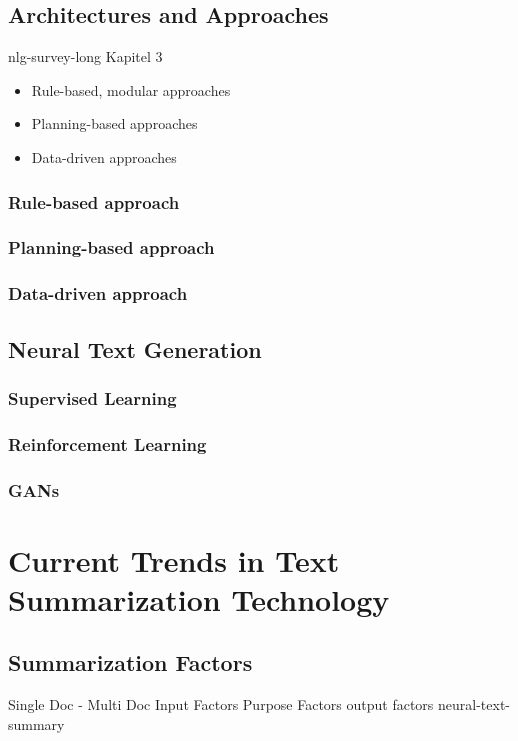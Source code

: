 \subsection{Architectures and Approaches}

nlg-survey-long Kapitel 3

\begin{itemize}
	\item Rule-based, modular approaches
	\item Planning-based approaches
	\item Data-driven approaches
\end{itemize}

\subsubsection{Rule-based approach}
\subsubsection{Planning-based approach}
\subsubsection{Data-driven approach}


\subsection{Neural Text Generation}

\subsubsection{Supervised Learning}
\subsubsection{Reinforcement Learning}
\subsubsection{GANs}

\section{Current Trends in Text Summarization Technology}\label{ss:trends}

\subsection{Summarization Factors}
Single Doc - Multi Doc
Input Factors
Purpose Factors
output factors
neural-text-summary

